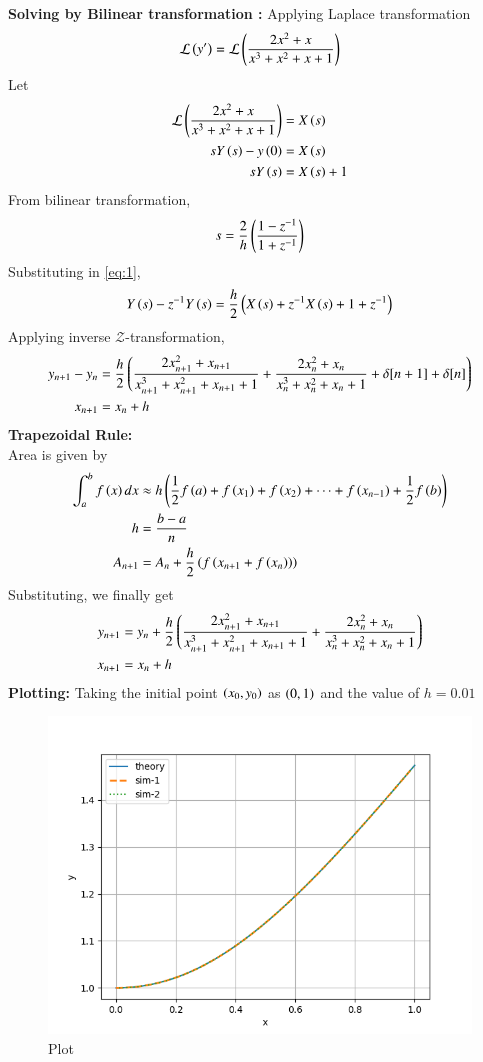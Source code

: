 \documentclass[journal]{IEEEtran}
\begin{document}
\textbf{Solving by Bilinear transformation :}
Applying Laplace transformation
\begin{align}
\mathcal{L}\left(y^\prime\right)=\mathcal{L}\left(\frac{2x^2+x}{x^3+x^2+x+1}\right)\\
\end{align}
Let 
\begin{align}
\mathcal{L}\left(\frac{2x^2+x}{x^3+x^2+x+1}\right)&=X\left(s\right)\\
sY\left(s\right)-y\left(0\right)&=X\left(s\right)\\
sY\left(s\right)&=X\left(s\right)+1\label{eq:1}
\end{align}
From bilinear transformation,
\begin{align}
s=\frac{2}{h}\left(\frac{1-z^{-1}}{1+z^{-1}}\right)
\end{align}
Substituting in \eqref{eq:1},
\begin{align}
Y\left(s\right)-z^{-1}Y\left(s\right)=\frac{h}{2}\left(X\left(s\right)+z^{-1}X\left(s\right)+1+z^{-1}\right)
\end{align}
Applying inverse $\mathcal{Z}$-transformation,
\begin{align}
y_{n+1}-y_n&=\frac{h}{2}\left(\frac{2x_{n+1}^2+x_{n+1}}{x_{n+1}^3+x_{n+1}^2+x_{n+1}+1}+\frac{2x_{n}^2+x_{n}}{x_{n}^3+x_{n}^2+x_{n}+1}+\delta[n+1]
+\delta[n]
\right)\\
x_{n+1}&=x_n+h
\end{align}
\textbf{Trapezoidal Rule:}\\
Area is given by
\begin{align}
\int_a^{b} f\left(x\right)dx&\approx h\left(\frac{1}{2}f\left(a\right)+f\left(x_1\right)+f\left(x_2\right)+\dots +f\left(x_{n-1}\right)+\frac{1}{2}f\left(b\right)\right)\\
h&=\frac{b-a}{n}\\
A_{n+1}&=A_n+\frac{h}{2}\left(f\left(x_{n+1}+f\left(x_n\right)\right)\right)
\end{align}
Substituting, we finally get
\begin{align}
y_{n+1}&=y_n+\frac{h}{2}\left(\frac{2x_{n+1}^2+x_{n+1}}{x_{n+1}^3+x_{n+1}^2+x_{n+1}+1}+\frac{2x_{n}^2+x_{n}}{x_{n}^3+x_{n}^2+x_{n}+1}\right)\\
x_{n+1}&=x_n+h
\end{align}
\textbf{Plotting:}
Taking the initial point $\left(x_0,y_0\right)$ as $\left(0,1\right)$ and the value of $h=0.01$
\begin{figure}[h!]
   \centering
   \includegraphics[width=1\columnwidth]{Figs/Figure_1.png}
   \caption{Plot}
\end{figure}
\end{document}
